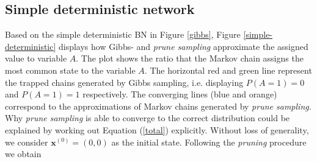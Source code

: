 \documentclass[a4paper, twoside, 11pt]{report}
\newcommand{\bfx}{{\mathbf{x}}}
\theoremstyle{plain}
\theoremstyle{definition}
\theoremstyle{remark}
\newcommand{\ps}{\textit{prune sampling }}
\newcommand{\psp}{\textit{prune sampling. }}
\begin{document}
\subsection{Simple deterministic network}
Based on the simple deterministic BN in Figure \ref{gibbs}, Figure \ref{simple-deterministic} displays how Gibbs- and \ps approximate the assigned value to variable $A$. The plot shows the ratio that the Markov chain assigns the most common state to the variable $A$. The horizontal red and green line represent the trapped chains generated by Gibbs sampling, i.e. displaying $P(A=1)=0$ and $P(A=1)=1$ respectively. The converging lines (blue and orange) correspond to the approximations of Markov chains generated by \psp \\

Why \ps is able to converge to the correct distribution could be explained by working out Equation (\ref{total}) explicitly. Without loss of generality, we consider $\bfx^{(0)} = (0,0)$ as the initial state. Following the \textit{pruning} procedure we obtain
\end{document}

